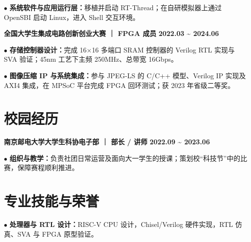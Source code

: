 \documentclass[11pt,a4paper,fontset=none]{ctexart}
\newcommand{\daterange}[1]{{\textbf{#1}}}
\newcommand{\entrytitle}[1]{{\textbf{#1}}}
\begin{document}
\par\noindent
$\bullet$ \textbf{系统软件与应用运行层：}移植并启动 RT-Thread；在自研模拟器上通过 OpenSBI 启动 Linux，进入 Shell 交互环境。

\par{}
\noindent
\entrytitle{全国大学生集成电路创新创业大赛 ｜ FPGA 成员}
\hfill \daterange{2022.03 \textasciitilde{} 2024.06}

\par\noindent
$\bullet$ \textbf{存储控制器设计：}完成 16×16 多端口 SRAM 控制器的 Verilog RTL 实现与 SVA 验证；45nm 工艺下主频 250MHz、总带宽 16Gbps。

\par\noindent
$\bullet$ \textbf{图像压缩 IP 与系统集成：}参与 JPEG-LS 的 C/C++ 模型、Verilog IP 实现及 AXI4 集成，在 MPSoC 平台完成 FPGA 回环测试；获 2023 年省级二等奖。


\section*{校园经历}
\vspace{-0.1em}

\noindent
\entrytitle{南京邮电大学大学生科协电子部 ｜ 部长 / 讲师}
\hfill \daterange{2022.09 \textasciitilde{} 2023.06}

\par\noindent
$\bullet$ \textbf{组织与教学：}负责社团日常运营及面向大一学生的授课；策划校“科技节”中的比赛，保障赛程顺利推进。

\section*{专业技能与荣誉}
\vspace{-0.1em}
\noindent $\bullet$ \textbf{处理器与 RTL 设计：}RISC-V CPU 设计，Chisel/Verilog 硬件实现，RTL 仿真、SVA 与 FPGA 原型验证。
\end{document}
